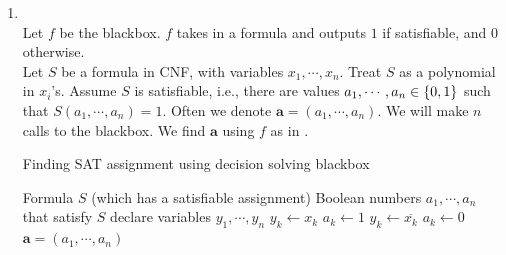 \soln

\begin{enumerate}[leftmargin=*]
\item {}\\
Let $f$ be the blackbox. $f$ takes in a formula and outputs $1$ if satisfiable, and $0$ otherwise. \\
Let $S$ be a formula in CNF, with variables $x_{1},\cdots,x_{n}$. Treat $S$ as a polynomial in $x_{i}$'s. Assume $S$ is satisfiable, i.e., there are values $a_{1},\cdots,a_{n}\in\left\{0,1\right\}$ such that $S(a_{1},\cdots,a_{n})=1$. Often we denote $\pmb a = (a_{1},\cdots,a_{n})$. We will make $n$ calls to the blackbox. We find $\pmb a$ using $f$ as in .

\begin{algorithm}
\caption{Finding SAT assignment using decision solving blackbox}\label{alg:sat}
\begin{algorithmic}
\Require Formula $S$ (which has a satisfiable assignment)
\Ensure Boolean numbers $a_{1},\cdots,a_{n}$ that satisfy $S$
\State declare variables $y_{1},\cdots, y_{n}$
\State $y_{k}\gets x_{k}$
	\State $a_{k} \gets 1$
\Else
	\State $y_{k}\gets \overline{x_{k}}$
	\State $a_{k} \gets 0$
\EndIf
\EndFor
\State \Return $\pmb a=(a_{1},\cdots,a_{n})$
\EndProcedure
\end{algorithmic}
\end{algorithm}


\end{enumerate}
